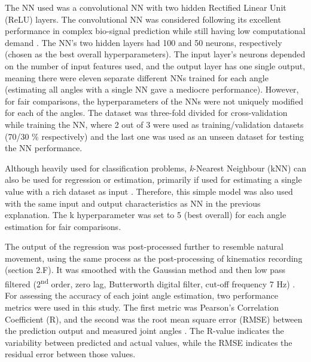 \documentclass[conference]{IEEEtran}
\begin{document}
The NN used was a convolutional NN with two hidden Rectified Linear Unit (ReLU) layers. The
convolutional NN was considered following its excellent performance in complex bio-signal prediction while still having low computational demand \cite{b33}\cite{b34}. The NN’s two hidden layers had 100 and 50 neurons,
respectively (chosen as the best overall hyperparameters). The input layer’s neurons depended on the number 
of input features used, and the output layer has one single output, meaning there were eleven separate
different NNs trained for each angle (estimating all angles with a single NN gave a mediocre
performance). However, for fair comparisons, the hyperparameters of the NNs were not uniquely modified 
for each of the angles. The dataset was three-fold divided for cross-validation while training the NN, where 
2 out of 3 were used as training/validation datasets (70/30 \% respectively) and the last one was used as an unseen 
dataset for testing the NN performance.

Although heavily used for classification problems, \textit{k}-Nearest Neighbour (kNN) can also be used for 
regression or estimation, primarily if used for estimating a single value with a rich dataset as input \cite{b35}. 
Therefore, this simple model was also used with the same input and output characteristics as NN in the 
previous explanation. The k hyperparameter was set to 5 (best overall) for each angle estimation for fair 
comparisons.

The output of the regression was post-processed further to resemble natural movement, using the same 
process as the post-processing of kinematics recording (section 2.F). It was smoothed with the Gaussian 
method and then low pass filtered (2\textsuperscript{nd} order, zero lag, Butterworth digital filter, cut-off frequency 7 Hz) 
\cite{b9}\cite{b16}.
For assessing the accuracy of each joint angle estimation, two performance metrics were used in this 
study. The first metric was Pearson’s Correlation Coefficient (R), and the second was the root mean square 
error (RMSE) between the prediction output and measured joint angles \cite{b16}. The R-value indicates the 
variability between predicted and actual values, while the RMSE indicates the residual error between those 
values.
\end{document}
